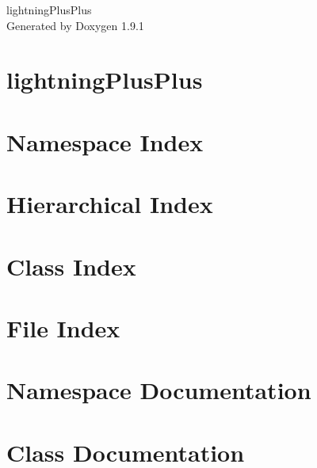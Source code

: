 \let\mypdfximage\pdfximage\def\pdfximage{\immediate\mypdfximage}\documentclass[twoside]{book}
\newcommand{\+}{\discretionary{\mbox{\scriptsize$\hookleftarrow$}}{}{}}
\newcommand{\clearemptydoublepage}{%
  \newpage{\pagestyle{empty}\cleardoublepage}%
}
\begin{document}
\raggedbottom

\hypersetup{pageanchor=false,
             bookmarksnumbered=true,
             pdfencoding=unicode
            }
\begin{titlepage}
\vspace*{7cm}
\begin{center}%
{\Large lightning\+Plus\+Plus }\\
\vspace*{1cm}
{\large Generated by Doxygen 1.9.1}\\
\end{center}
\end{titlepage}
\clearemptydoublepage
{}
\tableofcontents
\clearemptydoublepage
{}
\hypersetup{pageanchor=true}

\chapter{lightning\+Plus\+Plus}
\label{md__r_e_a_d_m_e}

\chapter{Namespace Index}

\chapter{Hierarchical Index}

\chapter{Class Index}

\chapter{File Index}

\chapter{Namespace Documentation}






\chapter{Class Documentation}













\end{document}
